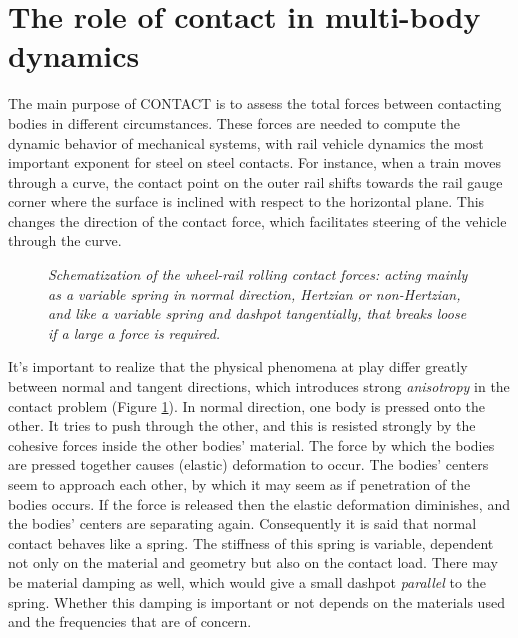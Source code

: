 \documentclass[12pt]{report}
\begin{document}
\section{The role of contact in multi-body dynamics}

The main purpose of CONTACT is to assess the total forces between
contacting bodies in different circumstances. These forces are needed to
compute the dynamic behavior of mechanical systems, with rail vehicle
dynamics the most important exponent for steel on steel contacts. For
instance, when a train moves through a curve, the contact
point on the outer rail shifts towards the rail gauge corner where the
surface is inclined with respect to the horizontal plane. This changes the
direction of the contact force, which facilitates steering of the vehicle
through the curve.

\begin{figure}[bt]
\centering
{}
\caption{\em Schematization of the wheel-rail rolling contact forces:
acting mainly as a variable spring in normal direction, Hertzian or
non-Hertzian, and like a variable spring and dashpot tangentially, that
breaks loose if a large a force is required.}
\label{fig:dashpot}
\end{figure}

It's important to realize that the physical phenomena at play differ
greatly between normal and tangent directions, which introduces strong {\em
anisotropy\/} in the contact problem (Figure \ref{fig:dashpot}). In normal
direction, one body is pressed onto the other. It tries to push
through the other, and this is resisted strongly by the cohesive forces
inside the other bodies' material. The force by which the bodies are
pressed together causes (elastic) deformation to occur. The bodies' centers
seem to approach each other, by which it may seem as if penetration of the
bodies occurs. If the force is released then the elastic deformation
diminishes, and the bodies' centers are separating again. Consequently
it is said that normal contact behaves like a spring. The stiffness of this
spring is variable, dependent not only on the material and geometry but
also on the contact load. There may be material damping as well, which
would give a small dashpot {\em parallel\/} to the spring. Whether this
damping is important or not depends on the materials used and the frequencies
that are of concern.
\end{document}
